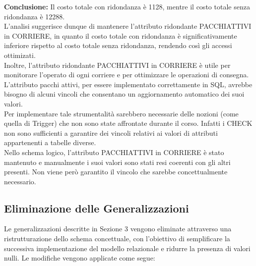 \textbf{Conclusione:} Il costo totale con ridondanza è 1128, mentre il costo totale senza ridondanza è 12288.\\
L'analisi suggerisce dunque di mantenere l'attributo ridondante PACCHIATTIVI in CORRIERE, in quanto il costo totale con ridondanza è significativamente inferiore rispetto al costo totale senza ridondanza, rendendo così gli accessi ottimizati.\\
Inoltre, l'attributo ridondante PACCHIATTIVI in CORRIERE è utile per monitorare l'operato di ogni corriere e per ottimizzare le operazioni di consegna.
L'attributo pacchi attivi, per essere implementato correttamente in SQL, avrebbe bisogno di alcuni vincoli che consentano un aggiornamento automatico dei suoi valori.\\
Per implementare tale strumentalità sarebbero necessarie delle nozioni (come quella di Trigger) che non sono state affrontate durante il corso. Infatti i CHECK non sono sufficienti a garantire dei vincoli relativi ai valori di attributi appartenenti a tabelle diverse.\\
Nello schema logico, l'attributo PACCHIATTIVI in CORRIERE è stato mantenuto e manualmente i suoi valori sono stati resi coerenti con gli altri presenti. Non viene però garantito il vincolo che sarebbe concettualmente necessario.





\subsection{Eliminazione delle Generalizzazioni}

Le generalizzazioni descritte in Sezione 3 vengono eliminate attraverso una ristrutturazione dello schema concettuale, con l’obiettivo di semplificare la successiva implementazione del modello relazionale e ridurre la presenza di valori nulli. Le modifiche
vengono applicate come segue:

